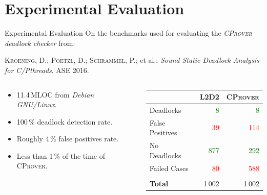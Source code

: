 \documentclass[10pt, xcolor=pdflatex, hyperref={unicode}, aspectratio=169]{beamer}
\begin{document}
\section{Experimental Evaluation}
\begin{frame}{Experimental Evaluation}
    \normalsize{On the benchmarks used for evaluating the \emph{\textsc{CProver} deadlock checker} from:}
    \begin{thebibliography}{1}
        \normalsize
        \textsc{Kroening, D.; Poetzl, D.; Schrammel, P.}; et al.: \textit{Sound Static Deadlock Analysis for C/Pthreads}. ASE 2016.
    \end{thebibliography}

    \bigskip

    \begin{columns}
        \begin{column}{.5 \linewidth}
            \begin{itemize}\setlength\itemsep{.5em}
                \item \alert{11.4\,MLOC} from \emph{Debian GNU/Linux}.

                \item \alert{100\,\% deadlock detection} rate.

                \item Roughly \alert{4\,\% false positives} rate.

                \item Less than \alert{1\,\%} of the time of \textsc{CProver}.
            \end{itemize}
        \end{column}

        \begin{column}{.5 \linewidth}
            \begin{tabular}{lrr}
                & \textsc{\alert{\textbf{L2D2}}} & \textsc{CProver} \\ \midrule

                Deadlocks & \textcolor{darkgreen}{8} & \textcolor{darkgreen}{8} \\

                False Positives & \textcolor{red}{39} & \textcolor{red}{114} \\

                No Deadlocks & \textcolor{darkgreen}{877} & \textcolor{darkgreen}{292} \\

                Failed Cases & \textcolor{red}{80} & \textcolor{red}{588} \\ \bottomrule \\[-1em]

                \textbf{Total} & 1\,002 & 1\,002
            \end{tabular}
        \end{column}
    \end{columns}
\end{frame}


\end{document}
